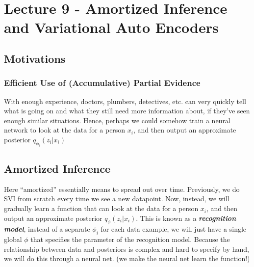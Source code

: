 \documentclass[11pt]{article}
\begin{document}
\section{Lecture 9 - Amortized Inference and Variational Auto Encoders}
\subsection{Motivations}

\subsubsection{Efficient Use of (Accumulative) Partial Evidence}
With enough experience, doctors, plumbers, detectives, etc. can very quickly tell what is going on and what they still need more information about, if they've seen enough similar situations. Hence, perhaps we could somehow train a neural network to look at the data for a person $x_i$, and then output an approximate posterior $q_{\phi_{i}}\left(z_{i} | x_{i}\right)$

\subsection{Amortized Inference}
Here ``amortized'' essentially means to spread out over time. Previously, we do SVI from scratch every time we see a new datapoint. Now, instead, we will gradually learn a function that can look at the data for a person $x_i$, and then output an approximate posterior $q_{\phi}\left(z_{i} | x_{i}\right)$. This is known as a \textit{\textbf{recognition model}}, instead of a separate $\phi_i$ for each data example, we will just have a single global $\phi$ that specifies the parameter of the recognition model. Because the relationship between data and posteriors is complex and hard to specify by hand, we will do this through a neural net. (we make the neural net learn the function!)
\end{document}
